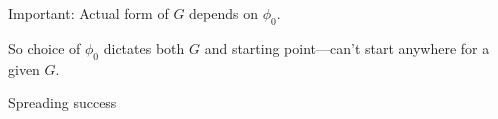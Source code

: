       \alert{Important:}
      Actual form of $G$ depends on $\phi_0$.  
    
      So choice of $\phi_0$ dictates both $G$ and starting
      point---can't start anywhere for a given $G$.
    
  

{Spreading success}




